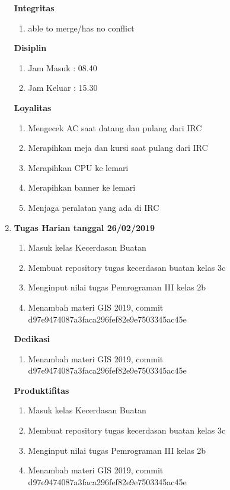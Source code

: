 \begin{enumerate}
\textbf{Integritas}
\begin{enumerate}
\item able to merge/has no conflict
\end{enumerate}

\textbf{Disiplin}
\begin{enumerate}
\item Jam Masuk : 08.40
\item Jam Keluar : 15.30
\end{enumerate}

\textbf{Loyalitas}
\begin{enumerate}
\item Mengecek AC saat datang dan pulang dari IRC
\item Merapihkan meja dan kursi saat pulang dari IRC
\item Merapihkan CPU ke lemari
\item Merapihkan banner ke lemari
\item Menjaga peralatan yang ada di IRC  
\end{enumerate}

\item \textbf{Tugas Harian tanggal 26/02/2019}
\begin{enumerate}
\item Masuk kelas Kecerdasan Buatan
\item Membuat repository tugas kecerdasan buatan kelas 3c
\item Menginput nilai tugas Pemrograman III kelas 2b
\item Menambah materi GIS 2019, commit d97e9474087a3faca296fef82e9e7503345ac45e
\end{enumerate}

\textbf{Dedikasi}
\begin{enumerate}
\item Menambah materi GIS 2019, commit d97e9474087a3faca296fef82e9e7503345ac45e
\end{enumerate}

\textbf{Produktifitas}
\begin{enumerate}
\item Masuk kelas Kecerdasan Buatan
\item Membuat repository tugas kecerdasan buatan kelas 3c
\item Menginput nilai tugas Pemrograman III kelas 2b
\item Menambah materi GIS 2019, commit d97e9474087a3faca296fef82e9e7503345ac45e
\end{enumerate}


\end{enumerate}
